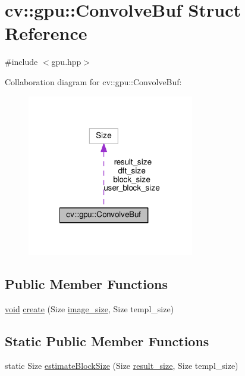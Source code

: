 \hypertarget{structcv_1_1gpu_1_1ConvolveBuf}{\section{cv\-:\-:gpu\-:\-:Convolve\-Buf Struct Reference}
\label{structcv_1_1gpu_1_1ConvolveBuf}
}


{\ttfamily \#include $<$gpu.\-hpp$>$}



Collaboration diagram for cv\-:\-:gpu\-:\-:Convolve\-Buf\-:\nopagebreak
\begin{figure}[H]
\begin{center}
\leavevmode
\includegraphics[width=206pt]{structcv_1_1gpu_1_1ConvolveBuf__coll__graph}
\end{center}
\end{figure}
\subsection*{Public Member Functions}
\begin{DoxyCompactItemize}
\item 
\hyperlink{legacy_8hpp_a8bb47f092d473522721002c86c13b94e}{void} \hyperlink{structcv_1_1gpu_1_1ConvolveBuf_a02c57cff9953d432a0e7f54ed03198a7}{create} (Size \hyperlink{calib3d_8hpp_a3c5695da25794e723582c8b5ccff544c}{image\-\_\-size}, Size templ\-\_\-size)
\end{DoxyCompactItemize}
\subsection*{Static Public Member Functions}
\begin{DoxyCompactItemize}
\item 
static Size \hyperlink{structcv_1_1gpu_1_1ConvolveBuf_add5e4e8a64c63eaa3053c38112ba80a8}{estimate\-Block\-Size} (Size \hyperlink{structcv_1_1gpu_1_1ConvolveBuf_a1fcc3ca5bfa580528118ce922b3692b7}{result\-\_\-size}, Size templ\-\_\-size)
\end{DoxyCompactItemize}
